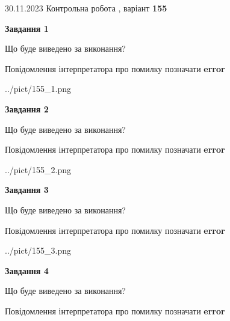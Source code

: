 \documentclass[12pt, ukrainian]{article}
\begin{document}
{{30.11.2023 Контрольна робота , варіант  \No \textbf { 155 }\par}}
{




{\begin {center}\textbf{Завдання 1}\end {center}}\par
Що буде виведено за виконання? \par
Повідомлення інтерпретатора про помилку позначати \textbf{error}

\begin{center}
	{../pict/155_1.png}
\end{center}
\newpage

{\begin {center}\textbf{Завдання 2}\end {center}}\par
Що буде виведено за виконання? \par
Повідомлення інтерпретатора про помилку позначати \textbf{error}

\begin{center}
	{../pict/155_2.png}
\end{center}
\newpage

{\begin {center}\textbf{Завдання 3}\end {center}}\par
Що буде виведено за виконання? \par
Повідомлення інтерпретатора про помилку позначати \textbf{error}

\begin{center}
	{../pict/155_3.png}
\end{center}
\newpage

{\begin {center}\textbf{Завдання 4}\end {center}}\par
Що буде виведено за виконання? \par
Повідомлення інтерпретатора про помилку позначати \textbf{error}

}
\end{document}
